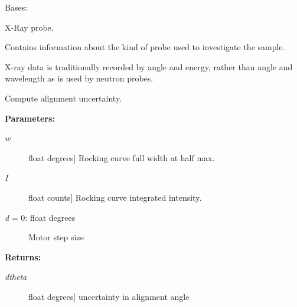\documentclass[letterpaper,10pt,english]{sphinxmanual}
\begin{document}
\begin{fulllineitems}
\label{api/probe:refl1d.probe.XrayProbe}
Bases: {\hyperref[api/probe:refl1d.probe.Probe]{}}

X-Ray probe.

Contains information about the kind of probe used to investigate
the sample.

X-ray data is traditionally recorded by angle and energy, rather
than angle and wavelength as is used by neutron probes.

\begin{fulllineitems}
\label{api/probe:refl1d.probe.XrayProbe.Q}
\end{fulllineitems}


\begin{fulllineitems}
\label{api/probe:refl1d.probe.XrayProbe.alignment_uncertainty}
Compute alignment uncertainty.

\textbf{Parameters:}
\begin{description}
\item[{\emph{w}}] \leavevmode{[}float \textbar{} degrees{]}
Rocking curve full width at half max.

\item[{\emph{I}}] \leavevmode{[}float \textbar{} counts{]}
Rocking curve integrated intensity.

\item[{\emph{d} = 0: float \textbar{} degrees}] \leavevmode
Motor step size

\end{description}

\textbf{Returns:}
\begin{description}
\item[{\emph{dtheta}}] \leavevmode{[}float \textbar{} degrees{]}
uncertainty in alignment angle

\end{description}


\end{fulllineitems}
\end{fulllineitems}
\end{document}

